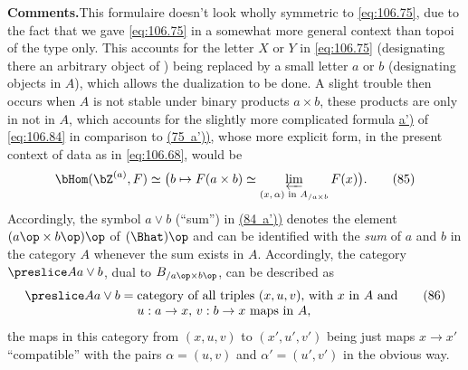 \textbf{Comments.}\enspace This formulaire doesn't look wholly
symmetric to \eqref{eq:106.75}, due to the fact that we gave
\eqref{eq:106.75} in a somewhat more general context than topoi of the
type \Ahat{} only. This accounts for the letter $X$ or $Y$ in
\eqref{eq:106.75} (designating there an arbitrary object of \Ahat)
being replaced by a small letter $a$ or $b$ (designating objects in
$A$), which allows the dualization to be done. A slight trouble then
occurs when $A$ is not stable under binary products $a\times b$, these
products are only in \Ahat{} not in $A$, which accounts for the
slightly more complicated formula \hyperref[eq:106.84]{a')} of
\eqref{eq:106.84} in comparison to \hyperref[eq:106.75]{(75~a'))},
whose more explicit form, in the present context of data as in
\eqref{eq:106.68}, would be
\begin{equation}
  \label{eq:106.85}
  \bHom(\bZ^{(a)},F)\simeq\bigl(b\mapsto F(a\times
  b)\simeq\varprojlim_{\text{$(x,\alpha)$ in $A_{/a\times b}$}}
  F(x)\bigr).\tag{85} 
\end{equation}
Accordingly, the symbol $a\lor b$ (``sum'') in
\hyperref[eq:106.84]{(84~a'))} denotes the element $(a\op\times
b\op)\op$ of $(\Bhat)\op$ and can be identified with the \emph{sum} of
$a$ and $b$ in the category $A$ whenever the sum exists in
$A$. Accordingly, the category $\preslice A{a\lor b}$, dual to
$B_{/a\op\times b\op}$, can be described as
\begin{equation}
  \label{eq:106.86}
  \preslice A{a\lor b}=
  \begin{tabular}[t]{@{}l@{}}
    category of all triples $(x,u,v)$, with $x$ in $A$ and \\
    $u:a\to x$, $v:b\to x$ maps in $A$,
  \end{tabular}\tag{86}
\end{equation}
the maps in this category from $(x,u,v)$ to $(x',u',v')$ being just
maps $x\to x'$ ``compatible'' with the pairs $\alpha=(u,v)$ and
$\alpha'=(u',v')$ in the obvious way.

